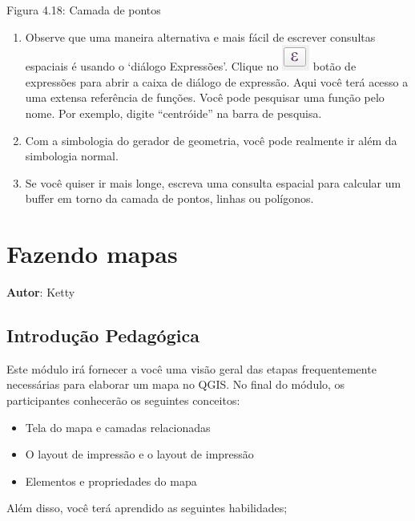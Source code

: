 \documentclass[
  portuguese,
]{krantz}
\providecommand{\tightlist}{%
  \setlength{\itemsep}{0pt}\setlength{\parskip}{0pt}}
\begin{document}
Figura 4.18: Camada de pontos

\begin{enumerate}
\def\labelenumi{\arabic{enumi}.}
\setcounter{enumi}{3}
\tightlist
\item
  Observe que uma maneira alternativa e mais fácil de escrever consultas espaciais é usando o `diálogo Expressões'. Clique no \includegraphics{media/modulo4/expression.png} botão de expressões para abrir a caixa de diálogo de expressão. Aqui você terá acesso a uma extensa referência de funções. Você pode pesquisar uma função pelo nome. Por exemplo, digite ``centróide'' na barra de pesquisa.
\item
  Com a simbologia do gerador de geometria, você pode realmente ir além da simbologia normal.
\item
  Se você quiser ir mais longe, escreva uma consulta espacial para calcular um buffer em torno da camada de pontos, linhas ou polígonos.
\end{enumerate}

\hypertarget{fazendo-mapas}{%
\chapter{Fazendo mapas}\label{fazendo-mapas}}

\textbf{Autor}: Ketty

\hypertarget{introduuxe7uxe3o-pedaguxf3gica-5}{%
\section{Introdução Pedagógica}\label{introduuxe7uxe3o-pedaguxf3gica-5}}

Este módulo irá fornecer a você uma visão geral das etapas frequentemente necessárias para elaborar um mapa no QGIS. No final do módulo, os participantes conhecerão os seguintes conceitos:

\begin{itemize}
\tightlist
\item
  Tela do mapa e camadas relacionadas
\item
  O layout de impressão e o layout de impressão
\item
  Elementos e propriedades do mapa
\end{itemize}

Além disso, você terá aprendido as seguintes habilidades;
\end{document}
